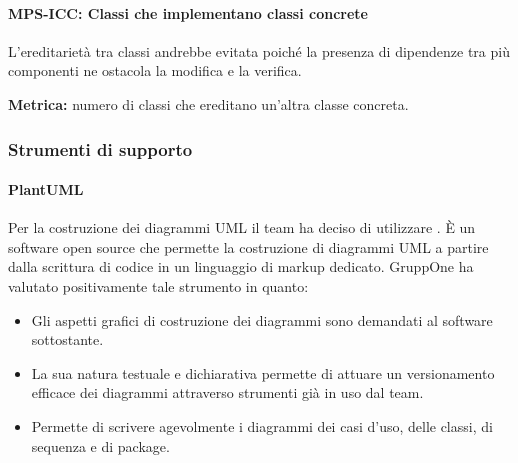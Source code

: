 \documentclass[../../norme-di-progetto.tex]{subfiles}
\begin{document}
\paragraph{MPS-ICC: Classi che implementano classi concrete}%
\label{par:MPS-ICC_classi_implementano_concrete}
L'ereditarietà tra classi andrebbe evitata poiché la presenza di dipendenze tra più componenti ne ostacola la modifica e la verifica.

\textbf{Metrica:} numero di classi che ereditano un'altra classe concreta.







\subsubsection{Strumenti di supporto}%
\label{subs:strumenti_di_supporto}

\paragraph{PlantUML}%
\label{par:plantuml}
Per la costruzione dei diagrammi UML il team ha deciso di utilizzare \@.
È un software open source che permette la costruzione di diagrammi UML a partire dalla scrittura di codice in un linguaggio di markup dedicato. GruppOne ha valutato positivamente tale strumento in quanto:

\begin{itemize}
  \item Gli aspetti grafici di costruzione dei diagrammi sono demandati al software sottostante.
  \item La sua natura testuale e dichiarativa permette di attuare un versionamento efficace dei diagrammi attraverso strumenti già in uso dal team.
  \item Permette di scrivere agevolmente i diagrammi dei casi d'uso, delle classi, di sequenza e di package.
\end{itemize}
\end{document}
